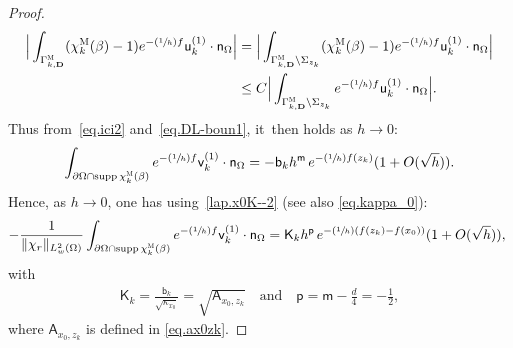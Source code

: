 \documentclass[10pt]{amsart}
\newcommand{\Psfrac}[2]{(\sfrac{#1}{#2})}
\newcommand{\quand}{\quad\text{and}\quad}
\newcommand{\mbf}[1]{\mathbf{#1}}
\DeclareMathOperator\supp{supp}
\theoremstyle{plain}
\theoremstyle{definition}
\begin{document}
\begin{proof}
\[\begin{aligned}
\Big \vert\int_{ \Gamma_{k,\mbf D}^{ \textsc{M} }}
(\chi_k^{\textsc{M}} (\beta)-1) e^{-\Psfrac 1hf} \mathsf u_k^{(1)}
\cdot \mathsf n_\Omega\Big \vert &= \Big\vert\int_{ \Gamma_{k,\mbf
D}^{ \textsc{M} }\setminus \Sigma_{z_k}}
(\chi_k^{\textsc{M}} (\beta)-1) e^{-\Psfrac 1hf} \mathsf u_k^{(1)}
\cdot \mathsf n_\Omega\Big \vert\\
&\le C \Big \vert \int_{ \Gamma_{k,\mbf D}^{ \textsc{M} }\setminus \Sigma_{z_k}} e^{-\Psfrac 1hf} \mathsf u_k^{(1)} \cdot \mathsf n_\Omega\Big \vert.
\end{aligned}
\]
Thus from~\eqref{eq.ici2} and~\eqref{eq.DL-boun1}, it~then holds as $h\to 0$:
\[
\int_{\partial \Omega \cap\supp \chi_k^{\textsc{M}} (\beta) } e^{-\Psfrac 1hf} \mathsf v_k^{(1)} \cdot \mathsf n_\Omega =-\mathsf b_k h^{\mathsf m} \, e^{-\Psfrac 1h f(z_k)} (1+O(\sqrt h)).
\]
Hence, as $h\to 0$, one has using~\eqref{lap.x0K--2} (see also \eqref{eq.kappa_0}):\vspace*{-3pt}
\begin{align*}
-\frac{1}{\Vert \chi_r\Vert_{L^2_w(\Omega)}} \int_{\partial \Omega \cap\supp \chi_k^{\textsc{M}} (\beta) } e^{-\Psfrac 1hf} \mathsf v_k^{(1)} \cdot \mathsf n_\Omega = \mathsf K_kh^{\mathsf p}\, e^{-\Psfrac 1h(f(z_k)-f(x_0))} (1+O(\sqrt h)),\
\end{align*}
with\vspace*{-3pt}
\begin{align}\label{eq.constantK}
\mathsf K_k= \frac{\mathsf b_k}{\sqrt{\kappa_{x_0}}}=\sqrt{\mathsf A_{x_0,z_k}}\quand\mathsf p=\mathsf m-\frac d4= -\frac 12,
\end{align}
where $\mathsf A_{x_0,z_k}$ is defined in \eqref{eq.ax0zk}.


\end{proof}
\end{document}
